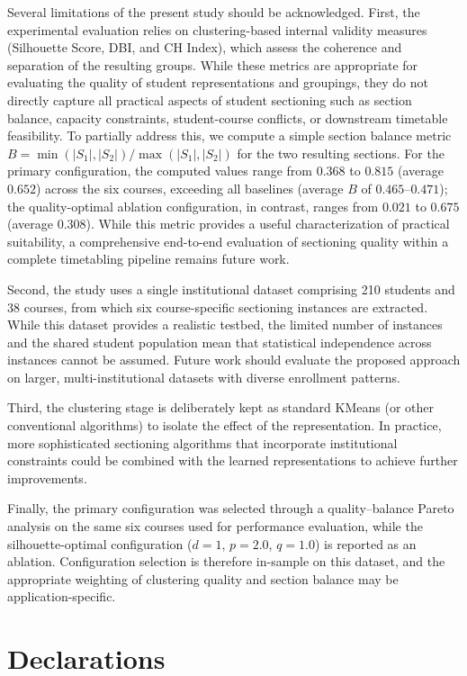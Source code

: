 \documentclass[pdflatex,sn-mathphys-num,iicol]{sn-jnl}%
\theoremstyle{thmstyleone}%
\theoremstyle{thmstyletwo}%
\theoremstyle{thmstylethree}%
\begin{document}
Several limitations of the present study should be acknowledged. First, the experimental evaluation relies on clustering-based internal validity measures (Silhouette Score, DBI, and CH Index), which assess the coherence and separation of the resulting groups. While these metrics are appropriate for evaluating the quality of student representations and groupings, they do not directly capture all practical aspects of student sectioning such as section balance, capacity constraints, student-course conflicts, or downstream timetable feasibility. To partially address this, we compute a simple section balance metric $B = \min(|S_1|,|S_2|) / \max(|S_1|,|S_2|)$ for the two resulting sections. For the primary configuration, the computed values range from $0.368$ to $0.815$ (average $0.652$) across the six courses, exceeding all baselines (average $B$ of $0.465$--$0.471$); the quality-optimal ablation configuration, in contrast, ranges from $0.021$ to $0.675$ (average $0.308$). While this metric provides a useful characterization of practical suitability, a comprehensive end-to-end evaluation of sectioning quality within a complete timetabling pipeline remains future work.

Second, the study uses a single institutional dataset comprising 210 students and 38 courses, from which six course-specific sectioning instances are extracted. While this dataset provides a realistic testbed, the limited number of instances and the shared student population mean that statistical independence across instances cannot be assumed. Future work should evaluate the proposed approach on larger, multi-institutional datasets with diverse enrollment patterns.

Third, the clustering stage is deliberately kept as standard KMeans (or other conventional algorithms) to isolate the effect of the representation. In practice, more sophisticated sectioning algorithms that incorporate institutional constraints could be combined with the learned representations to achieve further improvements.

Finally, the primary configuration was selected through a quality--balance Pareto analysis on the same six courses used for performance evaluation, while the silhouette-optimal configuration ($d=1$, $p=2.0$, $q=1.0$) is reported as an ablation. Configuration selection is therefore in-sample on this dataset, and the appropriate weighting of clustering quality and section balance may be application-specific.

\section{Declarations}
%
\end{document}
